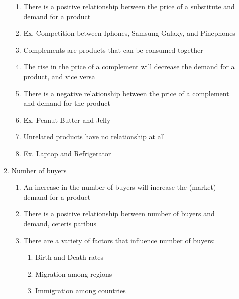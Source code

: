 \documentclass[12pt]{article}
\begin{document}
\begin{enumerate}
\begin{enumerate}
\begin{enumerate}
              \item There is a positive relationship between the price of a substitute and demand for a product

              \item Ex. Competition between Iphones, Samsung Galaxy, and Pinephones

              \item Complements are products that can be consumed together

              \item The rise in the price of a complement will decrease the demand for a product, and vice versa

              \item There is a negative relationship between the price of a complement and demand for the product

              \item Ex. Peanut Butter and Jelly

              \item Unrelated products have no relationship at all

              \item Ex. Laptop and Refrigerator

            \end{enumerate}
  
          \item Number of buyers

            \begin{enumerate}

              \item An increase in the number of buyers will increase the (market) demand for a product

              \item There is a positive relationship between number of buyers and demand, ceteris paribus

              \item There are a variety of factors that influence number of buyers:

                \begin{enumerate}

                  \item Birth and Death rates

                  \item Migration among regions

                  \item Immigration among countries


\end{enumerate}
\end{enumerate}
\end{enumerate}
\end{enumerate}
\end{document}
